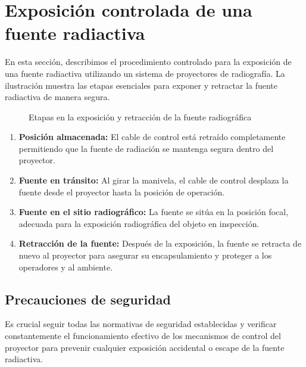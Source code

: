 
\section*{Exposición controlada de una fuente radiactiva}

En esta sección, describimos el procedimiento controlado para la exposición de una fuente radiactiva utilizando un sistema de proyectores de radiografía. La ilustración muestra las etapas esenciales para exponer y retractar la fuente radiactiva de manera segura.

\begin{figure}[ht]
    \centering
    \caption{Etapas en la exposición y retracción de la fuente radiográfica}
    \label{fig:source_exposure}
\end{figure}

\begin{enumerate}
    \item \textbf{Posición almacenada:} El cable de control está retraído completamente permitiendo que la fuente de radiación se mantenga segura dentro del proyector. 
    \item \textbf{Fuente en tránsito:} Al girar la manivela, el cable de control desplaza la fuente desde el proyector hasta la posición de operación.
    \item \textbf{Fuente en el sitio radiográfico:} La fuente se sitúa en la posición focal, adecuada para la exposición radiográfica del objeto en inspección.
    \item \textbf{Retracción de la fuente:} Después de la exposición, la fuente se retracta de nuevo al proyector para asegurar su encapsulamiento y proteger a los operadores y al ambiente.
\end{enumerate}

\subsection*{Precauciones de seguridad}
Es crucial seguir todas las normativas de seguridad establecidas y verificar constantemente el funcionamiento efectivo de los mecanismos de control del proyector para prevenir cualquier exposición accidental o escape de la fuente radiactiva.


\newpage
